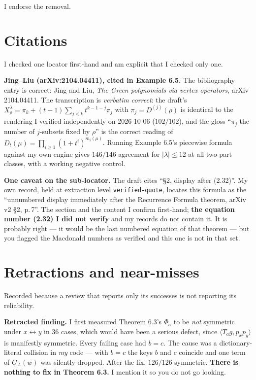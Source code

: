 \documentclass[11pt]{article}
\theoremstyle{definition}
\begin{document}
I endorse the removal.

\section{Citations}

I checked one locator first-hand and am explicit that I checked only one.

\textbf{Jing--Liu \cite{JingLiu} (arXiv:2104.04411), cited in Example 6.5.} The bibliography
entry is correct: Jing and Liu, \emph{The Green polynomials via vertex operators}, arXiv
2104.04411. The transcription is \emph{verbatim correct}: the draft's
$X^\lambda_\rho=\pi_k+(t-1)\sum_{j<k}t^{k-1-j}\pi_j$ with $\pi_j=D^{(j)}(\rho)$ is identical to
the rendering I verified independently on 2026-10-06 ($102/102$), and the gloss ``$\pi_j$ the
number of $j$-subsets fixed by $\rho$'' is the correct reading of
$D_t(\mu)=\prod_{i\ge1}(1+t^i)^{m_i(\mu)}$. Running Example 6.5's piecewise formula against my
own engine gives $146/146$ agreement for $|\lambda|\le12$ at all two-part classes, with a
working negative control.

\textbf{One caveat on the sub-locator.} The draft cites ``\S2, display after (2.32)''. My own
record, held at extraction level \texttt{verified-quote}, locates this formula as the
``unnumbered display immediately after the Recurrence Formula theorem, arXiv v2 \S2, p.\,7''. The
section and the content I confirm first-hand; \textbf{the equation number (2.32) I did not
verify} and my records do not contain it. It is probably right --- it would be the last numbered
equation of that theorem --- but you flagged the Macdonald numbers as verified and this one is
not in that set.

\section{Retractions and near-misses}

Recorded because a review that reports only its successes is not reporting its reliability.

\textbf{Retracted finding.} I first measured Theorem 6.3's $\Phi_a$ to be \emph{not} symmetric
under $x\leftrightarrow y$ in $36$ cases, which would have been a serious defect, since
$\langle T_ag,p_xp_y\rangle$ is manifestly symmetric. Every failing case had $b=c$. The cause
was a dictionary-literal collision in \emph{my} code --- with $b=c$ the keys $b$ and $c$
coincide and one term of $G_A(w)$ was silently dropped. After the fix, $126/126$ symmetric.
\textbf{There is nothing to fix in Theorem 6.3.} I mention it so you do not go looking.
\end{document}
